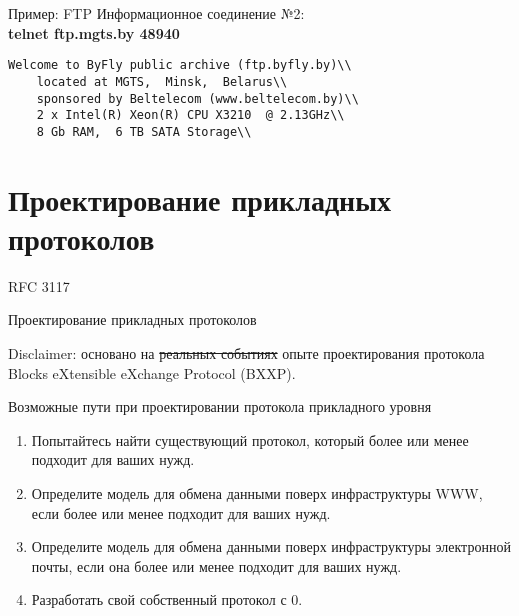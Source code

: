 \begin{frame}{Пример: FTP}
Информационное соединение №2:\\
\medskip
\scriptsize
{\bfseries telnet ftp.mgts.by 48940}\\
\begin{verbatim}
Welcome to ByFly public archive (ftp.byfly.by)\\
	located at MGTS,  Minsk,  Belarus\\
	sponsored by Beltelecom (www.beltelecom.by)\\
	2 x Intel(R) Xeon(R) CPU X3210  @ 2.13GHz\\
	8 Gb RAM,  6 TB SATA Storage\\
\end{verbatim}
\normalsize
\end{frame}

\section{Проектирование прикладных протоколов}

\begin{frame}{RFC 3117}

	\Huge
	\begin{center}
	Проектирование прикладных протоколов\\
	\end{center}
	\normalsize
	\bigskip
	Disclaimer: основано на \sout{реальных событиях} опыте проектирования протокола Blocks eXtensible eXchange Protocol (BXXP).
\end{frame}

\begin{frame}{Возможные пути при проектировании протокола прикладного уровня}

	\begin{enumerate}
		\item Попытайтесь найти существующий протокол,  который более или менее подходит для ваших нужд.
			\pause
		\item Определите модель для обмена данными поверх инфраструктуры WWW,  если более или менее подходит для ваших нужд.
			\pause
		\item Определите модель для обмена данными поверх инфраструктуры электронной почты,  если она более или менее подходит для ваших нужд.
			\pause
		\item Разработать свой собственный протокол с 0.
	\end{enumerate}
\end{frame}

